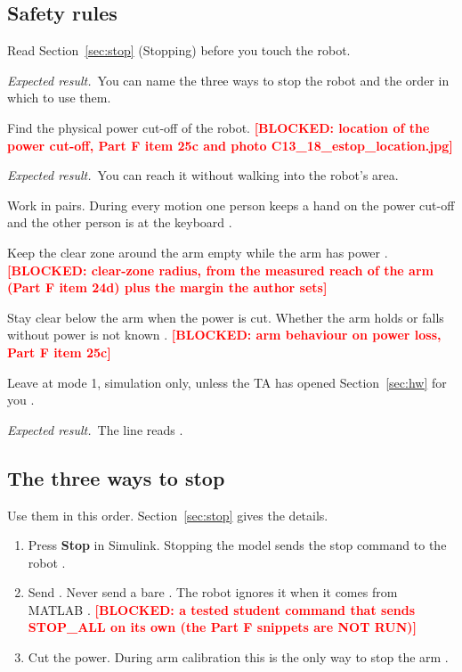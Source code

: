\documentclass[11pt]{article}
\newcommand{\todo}[1]{\textcolor{red}{\textbf{[#1]}}}
\newcommand{\cmd}[1]{\texttt{\romecode{#1}}}
\newif\ifshowsrc
\newcommand{\src}[1]{\ifshowsrc{\scriptsize\,[\texttt{\romecode{#1}}]}\fi}
\newcommand{\expect}{\par\textit{Expected result.}\ }
\begin{document}
\subsection*{Safety rules}
\begin{steps}
  \item Read Section~\ref{sec:stop} (Stopping) before you touch the robot.
  \expect You can name the three ways to stop the robot and the order in which to use them.
  \item Find the physical power cut-off of the robot.
  \todo{BLOCKED: location of the power cut-off, Part F item 25c and photo C13\_18\_estop\_location.jpg}
  \expect You can reach it without walking into the robot's area.
  \item Work in pairs. During every motion one person keeps a hand on the power cut-off and the
  other person is at the keyboard \src{docs/lab/PART_F_BENCH_CHECKLIST.md:18}.
  \item Keep the clear zone around the arm empty while the arm has power
  \src{docs/lab/PART_F_BENCH_CHECKLIST.md:20}.
  \todo{BLOCKED: clear-zone radius, from the measured reach of the arm (Part F item 24d) plus the margin the author sets}
  \item Stay clear below the arm when the power is cut. Whether the arm holds or falls without
  power is not known \src{docs/lab/PART_F_BENCH_CHECKLIST.md:21}.
  \todo{BLOCKED: arm behaviour on power loss, Part F item 25c}
  \item Leave \cmd{run_mode} at mode 1, simulation only, unless the TA has opened
  Section~\ref{sec:hw} for you \src{run_mode_table.m:30}.
  \expect The line reads \cmd{run_mode = 1;} \src{define_constants.m:7}.
\end{steps}

\subsection*{The three ways to stop}
Use them in this order. Section~\ref{sec:stop} gives the details.
\begin{enumerate}[label=(\alph*)]
  \item Press \textbf{Stop} in Simulink. Stopping the model sends the stop command
  \cmd{STOP_ALL} to the robot \src{ROMECommand.m:194-196}.
  \item Send \cmd{STOP_ALL}. Never send a bare \cmd{!}. The robot ignores it when it comes from MATLAB
  \src{UK-Arduino/ROME_ESP32_Code/ROME_ESP32_Code.ino:141-147}.
  \todo{BLOCKED: a tested student command that sends STOP\_ALL on its own (the Part F snippets are NOT RUN)}
  \item Cut the power. During arm calibration this is the only way to stop the arm
  \src{UK-Arduino/ROME_Teensy_Code/ROME_Teensy_Code.ino:160-163}.
\end{enumerate}
\end{document}
